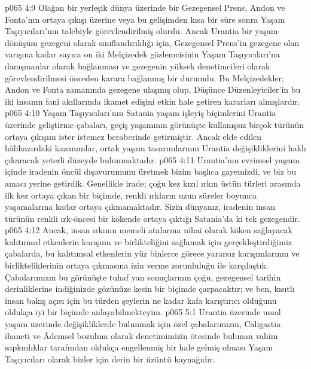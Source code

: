 \vs p065 4:9 Olağan bir yerleşik dünya üzerinde bir Gezegensel Prens, Andon ve Fonta’nın ortaya çıkışı üzerine veya bu gelişimden kısa bir süre sonra Yaşam Taşıyıcıları’nın talebiyle görevlendirilmiş olurdu. Ancak Urantia bir yaşam\hyp{}dönüşüm gezegeni olarak sınıflandırıldığı için, Gezegensel Prens’in gezegene olan varışına kadar sayıca on iki Melçizedek gözlemcisinin Yaşam Taşıyıcıları’na danışmanlar olarak bağlanması ve gezegenin yüksek denetimcileri olarak görevlendirilmesi önceden karara bağlanmış bir durumdu. Bu Melçizedekler; Andon ve Fonta zamanında gezegene ulaşmış olup, Düşünce Düzenleyiciler’in bu iki insanın fani akıllarında ikamet edişini etkin hale getiren kararları almışlardır.
\vs p065 4:10 Yaşam Taşıyıcıları’nın Satania yaşam işleyiş biçimlerini Urantia üzerinde geliştirme çabaları, geçiş yaşamının görünüşte kullanışsız birçok türünün ortaya çıkışını ister istemez beraberinde getirmiştir. Ancak elde edilen hâlihazırdaki kazanımlar, ortak yaşam tasarımlarının Urantia değişikliklerini haklı çıkaracak yeterli düzeyde bulunmaktadır.
\vs p065 4:11 Urantia’nın evrimsel yaşamı içinde iradenin öncül dışavurumunu üretmek bizim başlıca gayemizdi, ve biz bu amacı yerine getirdik. Genellikle irade; çoğu kez kızıl ırkın üstün türleri arasında ilk kez ortaya çıkan bir biçimde, renkli ırkların uzun süreler boyunca yaşamalarına kadar ortaya çıkmamaktadır. Sizin dünyanız, iradenin insan türünün renkli ırk\hyp{}öncesi bir kökende ortaya çıktığı Satania’da ki tek gezegendir.
\vs p065 4:12 Ancak, insan ırkının memeli atalarına nihai olarak köken sağlayacak kalıtımsal etkenlerin karışımı ve birlikteliğini sağlamak için gerçekleştirdiğimiz çabalarda, bu kalıtımsal etkenlerin yüz binlerce görece yararsız karışımlarının ve birlikteliklerinin ortaya çıkmasına izin verme zorunluluğu ile karşılaştık. Çabalarımızın bu görünüşte tuhaf yan sonuçlarının çoğu, gezegensel tarihin derinliklerine indiğinizde gözünüze kesin bir biçimde çarpacaktır; ve ben, kısıtlı insan bakış açısı için bu türden şeylerin ne kadar kafa karıştırıcı olduğunu oldukça iyi bir biçimde anlayabilmekteyim.
\vs p065 5:1 Urantia üzerinde ussal yaşam üzerinde değişikliklerde bulunmak için özel çabalarımızın, Caligastia ihaneti ve Âdemsel bozulma olarak denetimimizin ötesinde bulunan vahim sapkınlıklar tarafından oldukça engellenmiş bir hale gelmiş olması Yaşam Taşıyıcıları olarak bizler için derin bir üzüntü kaynağıdır.
